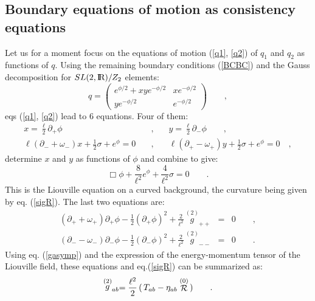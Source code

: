 \documentclass[a4paper,10pt]{article}
\begin{document}
\subsection{Boundary equations of motion as consistency equations}

Let us for a moment focus on the equations of motion (\ref{q1}, \ref{q2}) 
of $q_1$ and $q_2$ as functions of $q$. 
Using the remaining boundary conditions (\ref{BCBC}) and 
the Gauss decomposition for $SL(2,{\hbox{{\rm I}\kern-.2em\hbox{\rm R}}})/Z_2$ elements: 
\begin{equation} 
\label{Gaussq} 
q = \left(\begin{array}{cc}
e^{\phi /2} + xy e^{-\phi/2} &x e^{-\phi/2}\\
y e^{-\phi/2} &e^{-\phi/2}
\end{array}\right) \qquad ,
\end{equation}
eqs (\ref{q1}, \ref{q2}) lead to 6 equations. Four of them:  
\begin{eqnarray}
\label{XY}
x=\frac \ell 2 \partial _ {+} \phi & \quad, \quad & 
y=\frac \ell 2 \partial _ {-} \phi \qquad,\\
\label{DXY}
\ell (\partial_{-} + \omega _{-}) x + \frac 1 2 \sigma + e^\phi=0 & \quad, 
\quad & 
\ell (\partial_{+} - \omega _{+}) y + \frac 1 2 \sigma + e^\phi =0 \quad,
\end{eqnarray}
determine $x$ and $y$ as functions of $\phi$ and combine to give:
\begin{equation}
\label{43}
\Box \phi + \frac 8 {\ell^2} e^{\phi} + \frac 4 {\ell^2} \sigma = 0 \qquad .
\end{equation}
This is the Liouville equation on a curved background, the curvature
being given by eq. (\ref{sigR}).
The last two equations are:
\begin{eqnarray}
\label{eq5}
(\partial_{+} + \omega_{+})\partial_{+} \phi - 
 \frac 1 2 ( \partial_{+}\phi)^2 + \frac 2 {\ell^2} \, 
\stackrel {(2)} {g}_{++} & =&  0 
\qquad ,\\
\label{eq6}
(\partial_{-} - \omega_{-})\partial_{-} \phi - 
 \frac 1 2 ( \partial_{-}\phi)^2 + \frac 2 {\ell^2} \, 
\stackrel {(2)} {g}_{--} & =&  0 
\qquad .
\end{eqnarray}
Using eq. (\ref{gasymp}) and the expression of the energy-momentum tensor 
of the Liouville field,
these equations and eq.(\ref{sigR}) can be summarized as:
\begin{equation}
\label{Tab2}
\stackrel {(2)} g _{ab}  =   \frac {\ell^2} 2 \, ( \, T_{ab} 
- \eta _{ab}  \stackrel {(0)}{\cal R} \, ) \qquad .
\end{equation}
\end{document}
